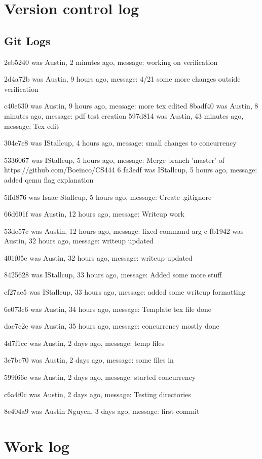 \documentclass[letterpaper,10pt,titlepage]{article}
\begin{document}
\section{Version control log}
\subsection{Git Logs}
2eb5240 was Austin, 2 minutes ago, message: working on verification

2d4a72b was Austin, 9 hours ago, message: 4/21 some more changes outside verification

c40e630 was Austin, 9 hours ago, message: more tex edited
8badf40 was Austin, 8 minutes ago, message: pdf test creation
597d814 was Austin, 43 minutes ago, message: Tex edit

304e7e8 was IStallcup, 4 hours ago, message: small changes to concurrency

5336067 was IStallcup, 5 hours ago, message: Merge branch 'master' of https://github.com/Boeinco/CS444
6
fa3edf was IStallcup, 5 hours ago, message: added qemu flag explanation

5ffd876 was Isaac Stallcup, 5 hours ago, message: Create .gitignore

66d601f was Austin, 12 hours ago, message: Writeup work

53de57c was Austin, 12 hours ago, message: fixed command arg
c
fb1942 was Austin, 32 hours ago, message: writeup updated

401f05e was Austin, 32 hours ago, message: writeup updated

8425628 was IStallcup, 33 hours ago, message: Added some more stuff

cf27ae5 was IStallcup, 33 hours ago, message: added some writeup formatting

6e073c6 was Austin, 34 hours ago, message: Template tex file done

dae7e2e was Austin, 35 hours ago, message: concurrency mostly done

4d7f1cc was Austin, 2 days ago, message: temp files

3e7be70 was Austin, 2 days ago, message: some files in

599f66e was Austin, 2 days ago, message: started concurrency

c6a4f0c was Austin, 2 days ago, message: Testing directories

8e404a9 was Austin Nguyen, 3 days ago, message: first commit


\section{Work log}
\end{document}
